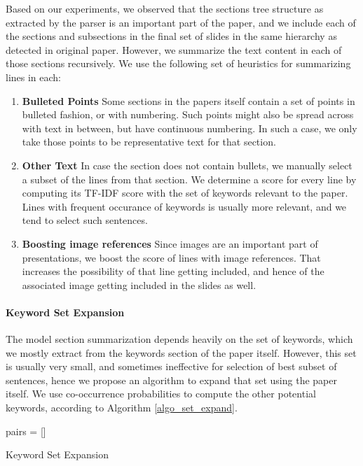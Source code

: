 Based on our experiments, we observed that the sections tree structure as extracted
by the parser is an important part of the paper, and we include each of the sections
and subsections in the final set of slides in the same hierarchy as detected
in original paper. However, we summarize the text content in each of those sections
recursively. We use the following set of heuristics for summarizing lines in each:
\begin{enumerate}
	\item \textbf{Bulleted Points} Some sections in the papers itself contain a set of
	points in bulleted fashion, or with numbering. Such points might also be spread
	across with text in between, but have continuous numbering. In such a case, we
	only take those points to be representative text for that section.
	\item \textbf{Other Text} In case the section does not contain bullets, we manually
	select a subset of the lines from that section. We determine a score for every line
	by computing its TF-IDF score with the set of keywords relevant to the paper. 
	Lines with frequent occurance of keywords is usually more relevant, and 
	we tend to select such sentences.
	\item \textbf{Boosting image references} Since images are an important 
	part of presentations, we boost the score of lines with image references.
	That increases the possibility of that line getting included, and hence 
	of the associated image getting included in the slides as well.
\end{enumerate}

\paragraph{Keyword Set Expansion}
The model section summarization depends heavily on the set of keywords, which we
mostly extract from the keywords section of the paper itself. However, this
set is usually very small, and sometimes ineffective for selection of best
subset of sentences, hence we propose an algorithm to expand that set 
using the paper itself. We use co-occurrence probabilities to compute the
other potential keywords, according to Algorithm \ref{algo_set_expand}. 

\begin{algorithm}[H]\label{algo_set_expand}
 \SetLine %
 pairs = []\\
 \caption{Keyword Set Expansion}
\end{algorithm}

